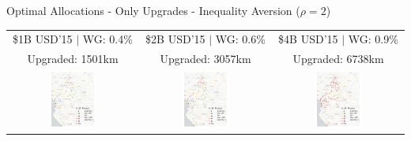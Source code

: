 \documentclass[aspectratio=169,xcolor=dvipsnames]{beamer}
\begin{document}
\begin{frame}[label=IOU_IA]{Optimal Allocations - Only Upgrades - Inequality Aversion ($\rho = 2$) \quad \hyperlink{IOU_IRS_IA}{}}
\vspace{-1mm}
\begin{adjustbox}{center}
\begin{tabular}{@{}c@{}|@{}c@{}|@{}c@{}} 
\$1B USD'15 $|$ WG: 0.4\% & \$2B USD'15 $|$ WG: 0.6\% & \$4B USD'15 $|$ WG: 0.9\%  \\
Upgraded: 1501km & Upgraded: 3057km & Upgraded: 6738km \\ 
\includegraphics[width=0.38\textwidth, trim= {0.9cm 0 0.9cm 0}, clip]{"../figures/GE/trans_africa_network_GE_20g_1b_fixed_cgc_sigma3.8_rho2_julia_MACR_90kmh_google_perc_ug.pdf"} & 
\includegraphics[width=0.38\textwidth, trim= {0.9cm 0 0.9cm 0}, clip]{"../figures/GE/trans_africa_network_GE_20g_2b_fixed_cgc_sigma3.8_rho2_julia_MACR_90kmh_google_perc_ug.pdf"} &
\includegraphics[width=0.38\textwidth, trim= {0.9cm 0 0.9cm 0}, clip]{"../figures/GE/trans_africa_network_GE_20g_4b_fixed_cgc_sigma3.8_rho2_julia_MACR_90kmh_google_perc_ug.pdf"}  
\end{tabular}
\end{adjustbox}
\end{frame}
\end{document}
